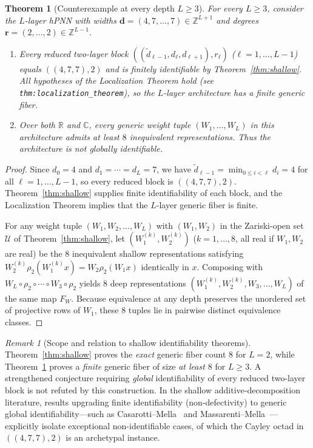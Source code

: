 \documentclass[11pt]{article}
\theoremstyle{plain}
\newtheorem{theorem}{Theorem}
\theoremstyle{definition}
\theoremstyle{remark}
\newtheorem{remark}{Remark}
\begin{document}
\begin{theorem}[Counterexample at every depth $L \ge 3$]\label{thm:deep}
For every $L \ge 3$, consider the $L$-layer hPNN with widths $\mathbf{d} = (4, 7, \dots, 7) \in \mathbb{Z}^{L+1}$ and degrees $\mathbf{r} = (2, \dots, 2) \in \mathbb{Z}^{L-1}$.
\begin{enumerate}[label=\textup{(\arabic*)}]
\item Every reduced two-layer block $((\tilde{d}_{\ell-1}, d_\ell, d_{\ell+1}), r_\ell)$ ($\ell = 1, \dots, L-1$) equals $((4, 7, 7), 2)$ and is finitely identifiable by Theorem~\ref{thm:shallow}. All hypotheses of the Localization Theorem hold (see \texttt{thm:localization\_theorem}), so the $L$-layer architecture has a \emph{finite} generic fiber.
\item Over both $\mathbb{R}$ and $\mathbb{C}$, every generic weight tuple $(W_1, \dots, W_L)$ in this architecture admits \emph{at least $8$} inequivalent representations. Thus the architecture is not globally identifiable.
\end{enumerate}
\end{theorem}

\begin{proof}
Since $d_0 = 4$ and $d_1 = \cdots = d_L = 7$, we have $\tilde{d}_{\ell-1} = \min_{0 \le i < \ell} d_i = 4$ for all $\ell = 1, \dots, L-1$, so every reduced block is $((4, 7, 7), 2)$. Theorem~\ref{thm:shallow} supplies finite identifiability of each block, and the Localization Theorem implies that the $L$-layer generic fiber is finite.

For any weight tuple $(W_1, W_2, \dots, W_L)$ with $(W_1, W_2)$ in the Zariski-open set $\mathcal{U}$ of Theorem~\ref{thm:shallow}, let $(W_1^{(k)}, W_2^{(k)})$ ($k = 1, \dots, 8$, all real if $W_1, W_2$ are real) be the $8$ inequivalent shallow representations satisfying $W_2^{(k)} \rho_2(W_1^{(k)} x) = W_2 \rho_2(W_1 x)$ identically in $x$. Composing with $W_L \circ \rho_2 \circ \cdots \circ W_3 \circ \rho_2$ yields $8$ deep representations $(W_1^{(k)}, W_2^{(k)}, W_3, \dots, W_L)$ of the same map $F_W$. Because equivalence at any depth preserves the unordered set of projective rows of $W_1$, these $8$ tuples lie in pairwise distinct equivalence classes.
\end{proof}

\begin{remark}[Scope and relation to shallow identifiability theorems]
Theorem~\ref{thm:shallow} proves the \emph{exact} generic fiber count $8$ for $L = 2$, while Theorem~\ref{thm:deep} proves a \emph{finite} generic fiber of size \emph{at least $8$} for $L \ge 3$.
A strengthened conjecture requiring \emph{global} identifiability of every reduced two-layer block is not refuted by this construction.
In the shallow additive-decomposition literature, results upgrading finite identifiability (non-defectivity) to generic global identifiability---such as Casarotti--Mella~\cite{casarotti2022non} and Massarenti--Mella~\cite{massarenti2025bronowski}---explicitly isolate exceptional non-identifiable cases, of which the Cayley octad in $((4,7,7), 2)$ is an archetypal instance.
\end{remark}
\end{document}
